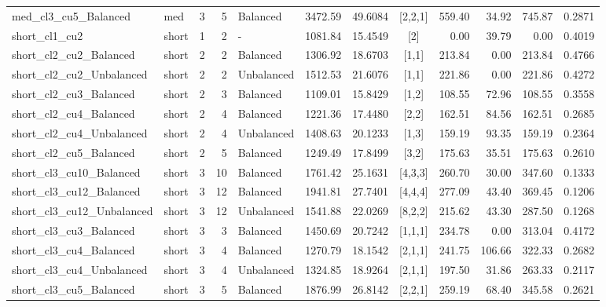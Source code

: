 \documentclass[3p,11pt,authoryear]{elsarticle}  %
\begin{document}
{\begin{longtable}{@{}l l r r l r r c r r r r@{}}
med\_cl3\_cu5\_Balanced & med & 3 & 5 & Balanced & 3472.59 & 49.6084 & [2,2,1] & 559.40 & 34.92 & 745.87 & 0.2871 \\
short\_cl1\_cu2 & short & 1 & 2 & - & 1081.84 & 15.4549 & [2] & 0.00 & 39.79 & 0.00 & 0.4019 \\
short\_cl2\_cu2\_Balanced & short & 2 & 2 & Balanced & 1306.92 & 18.6703 & [1,1] & 213.84 & 0.00 & 213.84 & 0.4766 \\
short\_cl2\_cu2\_Unbalanced & short & 2 & 2 & Unbalanced & 1512.53 & 21.6076 & [1,1] & 221.86 & 0.00 & 221.86 & 0.4272 \\
short\_cl2\_cu3\_Balanced & short & 2 & 3 & Balanced & 1109.01 & 15.8429 & [1,2] & 108.55 & 72.96 & 108.55 & 0.3558 \\
short\_cl2\_cu4\_Balanced & short & 2 & 4 & Balanced & 1221.36 & 17.4480 & [2,2] & 162.51 & 84.56 & 162.51 & 0.2685 \\
short\_cl2\_cu4\_Unbalanced & short & 2 & 4 & Unbalanced & 1408.63 & 20.1233 & [1,3] & 159.19 & 93.35 & 159.19 & 0.2364 \\
short\_cl2\_cu5\_Balanced & short & 2 & 5 & Balanced & 1249.49 & 17.8499 & [3,2] & 175.63 & 35.51 & 175.63 & 0.2610 \\
short\_cl3\_cu10\_Balanced & short & 3 & 10 & Balanced & 1761.42 & 25.1631 & [4,3,3] & 260.70 & 30.00 & 347.60 & 0.1333 \\
short\_cl3\_cu12\_Balanced & short & 3 & 12 & Balanced & 1941.81 & 27.7401 & [4,4,4] & 277.09 & 43.40 & 369.45 & 0.1206 \\
short\_cl3\_cu12\_Unbalanced & short & 3 & 12 & Unbalanced & 1541.88 & 22.0269 & [8,2,2] & 215.62 & 43.30 & 287.50 & 0.1268 \\
short\_cl3\_cu3\_Balanced & short & 3 & 3 & Balanced & 1450.69 & 20.7242 & [1,1,1] & 234.78 & 0.00 & 313.04 & 0.4172 \\
short\_cl3\_cu4\_Balanced & short & 3 & 4 & Balanced & 1270.79 & 18.1542 & [2,1,1] & 241.75 & 106.66 & 322.33 & 0.2682 \\
short\_cl3\_cu4\_Unbalanced & short & 3 & 4 & Unbalanced & 1324.85 & 18.9264 & [2,1,1] & 197.50 & 31.86 & 263.33 & 0.2117 \\
short\_cl3\_cu5\_Balanced & short & 3 & 5 & Balanced & 1876.99 & 26.8142 & [2,2,1] & 259.19 & 68.40 & 345.58 & 0.2621 \\
\bottomrule 
\end{longtable}
}
\end{document}
